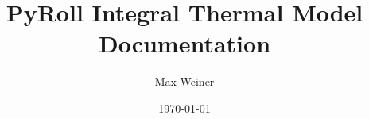 \documentclass{template/PyRollDocs}
\begin{document}
    \author{Max Weiner}
    \date{\today}
    \title{PyRoll Integral Thermal Model Documentation}

    \maketitle


    
    
    

\end{document}
